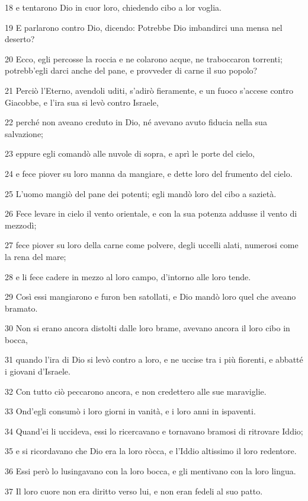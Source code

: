 \par 18 e tentarono Dio in cuor loro, chiedendo cibo a lor voglia.
\par 19 E parlarono contro Dio, dicendo: Potrebbe Dio imbandirci una mensa nel deserto?
\par 20 Ecco, egli percosse la roccia e ne colarono acque, ne traboccaron torrenti; potrebb'egli darci anche del pane, e provveder di carne il suo popolo?
\par 21 Perciò l'Eterno, avendoli uditi, s'adirò fieramente, e un fuoco s'accese contro Giacobbe, e l'ira sua si levò contro Israele,
\par 22 perché non aveano creduto in Dio, né avevano avuto fiducia nella sua salvazione;
\par 23 eppure egli comandò alle nuvole di sopra, e aprì le porte del cielo,
\par 24 e fece piover su loro manna da mangiare, e dette loro del frumento del cielo.
\par 25 L'uomo mangiò del pane dei potenti; egli mandò loro del cibo a sazietà.
\par 26 Fece levare in cielo il vento orientale, e con la sua potenza addusse il vento di mezzodì;
\par 27 fece piover su loro della carne come polvere, degli uccelli alati, numerosi come la rena del mare;
\par 28 e li fece cadere in mezzo al loro campo, d'intorno alle loro tende.
\par 29 Così essi mangiarono e furon ben satollati, e Dio mandò loro quel che aveano bramato.
\par 30 Non si erano ancora distolti dalle loro brame, avevano ancora il loro cibo in bocca,
\par 31 quando l'ira di Dio si levò contro a loro, e ne uccise tra i più fiorenti, e abbatté i giovani d'Israele.
\par 32 Con tutto ciò peccarono ancora, e non credettero alle sue maraviglie.
\par 33 Ond'egli consumò i loro giorni in vanità, e i loro anni in ispaventi.
\par 34 Quand'ei li uccideva, essi lo ricercavano e tornavano bramosi di ritrovare Iddio;
\par 35 e si ricordavano che Dio era la loro ròcca, e l'Iddio altissimo il loro redentore.
\par 36 Essi però lo lusingavano con la loro bocca, e gli mentivano con la loro lingua.
\par 37 Il loro cuore non era diritto verso lui, e non eran fedeli al suo patto.
